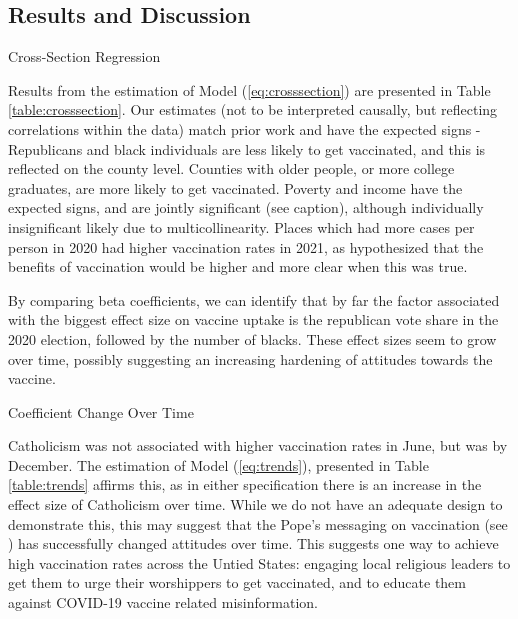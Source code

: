 \documentclass[12pt]{article}
\begin{document}
\begin{spacing}{1.5}
		\section{Results and Discussion}
		
		\begin{table}
			\centering
			\caption{Cross-Section Regression}
			\centerline{}
			\label{table:crosssection}
		\end{table}
		
		Results from the estimation of Model (\ref{eq:crosssection}) are presented in Table \ref{table:crosssection}. Our estimates (not to be interpreted causally, but reflecting correlations within the data) match prior work and have the expected signs - Republicans and black individuals are less likely to get vaccinated, and this is reflected on the county level. Counties with older people, or more college graduates, are more likely to get vaccinated. Poverty and income have the expected signs, and are jointly significant (see caption), although individually insignificant likely due to multicollinearity. Places which had more cases per person in 2020 had higher vaccination rates in 2021, as hypothesized that the benefits of vaccination would be higher and more clear when this was true.
		
		By comparing beta coefficients, we can identify that by far the factor associated with the biggest effect size on vaccine uptake is the republican vote share in the 2020 election, followed by the number of blacks. These effect sizes seem to grow over time, possibly suggesting an increasing hardening of attitudes towards the vaccine.
		
		\begin{table}
			\centering
			\caption{Coefficient Change Over Time}
			
			\label{table:trends}
		\end{table}
		
		Catholicism was not associated with higher vaccination rates in June, but was by December. The estimation of Model (\ref{eq:trends}), presented in Table \ref{table:trends} affirms this, as in either specification there is an increase in the effect size of Catholicism over time. While we do not have an adequate design to demonstrate this, this may suggest that the Pope's messaging on vaccination (see \citet{gawel_effects_2021}) has successfully changed attitudes over time. This suggests one way to achieve high vaccination rates across the Untied States: engaging local religious leaders to get them to urge their worshippers to get vaccinated, and to educate them against COVID-19 vaccine related misinformation.
		

\end{spacing}
\end{document}
